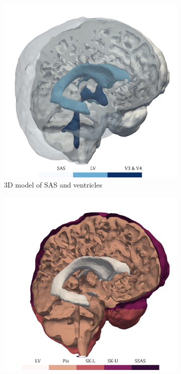 \documentclass[fleqn,10pt]{wlscirep}
\begin{document}
\begin{figure}[h!]
\begin{subfigure}[b]{0.33\textwidth}
\includegraphics[width = 1 \textwidth]{figures/subdomains.png}
\caption{3D model of SAS and ventricles}
\label{fig:csf_flow_geom}
\end{subfigure}
\begin{subfigure}[b]{0.33\textwidth}
\includegraphics[width = 1 \textwidth]{figures/boundaries.png}

\end{subfigure}
\end{figure}
\end{document}
